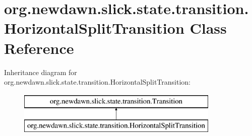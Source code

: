 \hypertarget{classorg_1_1newdawn_1_1slick_1_1state_1_1transition_1_1_horizontal_split_transition}{}\section{org.\+newdawn.\+slick.\+state.\+transition.\+Horizontal\+Split\+Transition Class Reference}
\label{classorg_1_1newdawn_1_1slick_1_1state_1_1transition_1_1_horizontal_split_transition}
Inheritance diagram for org.\+newdawn.\+slick.\+state.\+transition.\+Horizontal\+Split\+Transition\+:\begin{figure}[H]
\begin{center}
\leavevmode
\includegraphics[height=2.000000cm]{classorg_1_1newdawn_1_1slick_1_1state_1_1transition_1_1_horizontal_split_transition}
\end{center}
\end{figure}
